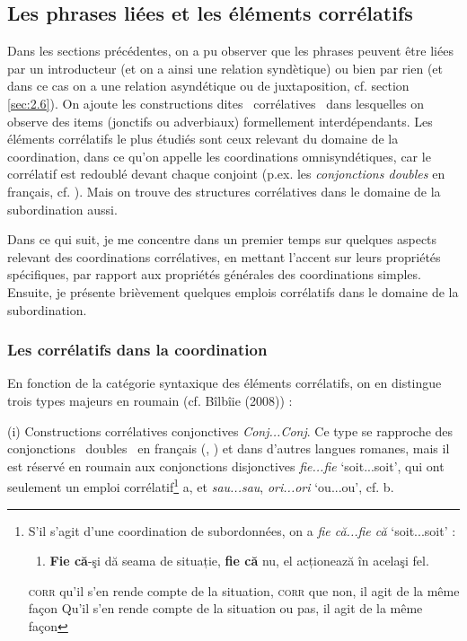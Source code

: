 \subsection{Les phrases liées et les éléments corrélatifs}
\label{bkm:Ref301432144}Dans les sections précédentes, on a pu observer que les phrases peuvent être liées par un introducteur (et on a ainsi une relation syndètique) ou bien par rien (et dans ce cas on a une relation asyndétique ou de juxtaposition, cf. section \ref{sec:2.6}). On ajoute les constructions dites {\guillemotleft}~corrélatives~{\guillemotright} dans lesquelles on observe des items (jonctifs ou adverbiaux) formellement interdépendants. Les éléments corrélatifs le plus étudiés sont ceux relevant du domaine de la coordination, dans ce qu'on appelle les coordinations omnisyndétiques, car le corrélatif est redoublé devant chaque conjoint (p.ex. les \textit{conjonctions doubles} en français,\textbf{} cf.\textbf{} \citet{Piot2000}). Mais on trouve des structures corrélatives dans le domaine de la subordination aussi. 

Dans ce qui suit, je me concentre dans un premier temps sur quelques aspects relevant des coordinations corrélatives, en mettant l'accent sur leurs propriétés spécifiques, par rapport aux propriétés générales des coordinations simples. Ensuite, je présente brièvement quelques emplois corrélatifs dans le domaine de la subordination.

\subsubsection{Les corrélatifs dans la coordination}
\label{bkm:Ref302037437}En fonction de la catégorie syntaxique des éléments corrélatifs, on en distingue trois types majeurs en roumain (cf. Bîlbîie (2008)) : 

(i) Constructions corrélatives conjonctives \textit{Conj...Conj}. Ce type se rapproche des conjonctions {\guillemotleft}~doubles~{\guillemotright} en français (\citet{Piot2000}, \citet{Mouret2007}) et dans d'autres langues romanes, mais il est réservé en roumain aux conjonctions disjonctives \textit{fie...fie} `soit...soit', qui ont seulement un emploi corrélatif\footnote{S'il s'agit d'une coordination de subordonnées, on a \textit{fie că...fie că} `soit...soit' :

\begin{enumerate}
\item \textbf{Fie că}-şi dă seama de situație, \textbf{fie că} nu, el acționează în acelaşi fel.


\end{enumerate}
\textsc{corr} qu'il s'en rende compte de la situation, \textsc{corr} que non, il agit de la même façon
Qu'il s'en rende compte de la situation ou pas, il agit de la même façon} a, et \textit{sau...sau},\textit{ ori...ori} `ou...ou', cf. b. 


